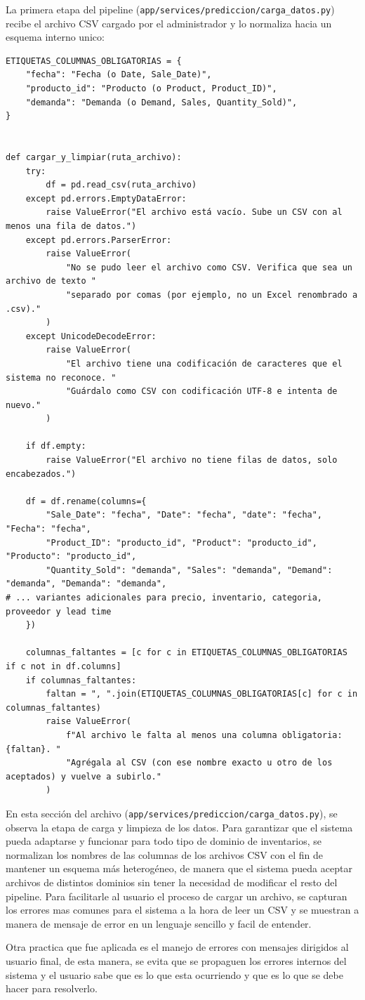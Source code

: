 La primera etapa del pipeline (\texttt{app/services/prediccion/carga\_datos.py}) recibe el archivo CSV cargado por el administrador y lo normaliza hacia un esquema interno unico:


\label{lst:carga_limpieza}
\begin{verbatim}
ETIQUETAS_COLUMNAS_OBLIGATORIAS = {
    "fecha": "Fecha (o Date, Sale_Date)",
    "producto_id": "Producto (o Product, Product_ID)",
    "demanda": "Demanda (o Demand, Sales, Quantity_Sold)",
}


def cargar_y_limpiar(ruta_archivo):
    try:
        df = pd.read_csv(ruta_archivo)
    except pd.errors.EmptyDataError:
        raise ValueError("El archivo está vacío. Sube un CSV con al menos una fila de datos.")
    except pd.errors.ParserError:
        raise ValueError(
            "No se pudo leer el archivo como CSV. Verifica que sea un archivo de texto "
            "separado por comas (por ejemplo, no un Excel renombrado a .csv)."
        )
    except UnicodeDecodeError:
        raise ValueError(
            "El archivo tiene una codificación de caracteres que el sistema no reconoce. "
            "Guárdalo como CSV con codificación UTF-8 e intenta de nuevo."
        )

    if df.empty:
        raise ValueError("El archivo no tiene filas de datos, solo encabezados.")

    df = df.rename(columns={
        "Sale_Date": "fecha", "Date": "fecha", "date": "fecha", "Fecha": "fecha",
        "Product_ID": "producto_id", "Product": "producto_id", "Producto": "producto_id",
        "Quantity_Sold": "demanda", "Sales": "demanda", "Demand": "demanda", "Demanda": "demanda",
# ... variantes adicionales para precio, inventario, categoria, proveedor y lead time
    })

    columnas_faltantes = [c for c in ETIQUETAS_COLUMNAS_OBLIGATORIAS if c not in df.columns]
    if columnas_faltantes:
        faltan = ", ".join(ETIQUETAS_COLUMNAS_OBLIGATORIAS[c] for c in columnas_faltantes)
        raise ValueError(
            f"Al archivo le falta al menos una columna obligatoria: {faltan}. "
            "Agrégala al CSV (con ese nombre exacto u otro de los aceptados) y vuelve a subirlo."
        )
\end{verbatim}

En esta sección del archivo (\texttt{app/services/prediccion/carga\_datos.py}), se observa la etapa de carga y limpieza de los datos. Para garantizar que el sistema pueda adaptarse y funcionar para todo tipo de dominio de inventarios, se normalizan los nombres de las columnas de los archivos CSV con el fin de mantener un esquema más heterogéneo, de manera que el sistema pueda aceptar archivos de distintos dominios sin tener la necesidad de modificar el resto del pipeline. Para facilitarle al usuario el proceso de cargar un archivo, se capturan los errores mas comunes para el sistema a la hora de leer un CSV y se muestran a manera de mensaje de error en un lenguaje sencillo y facil de entender.

Otra practica que fue aplicada es el manejo de errores con mensajes dirigidos al usuario final, de esta manera, se evita que se propaguen los errores internos del sistema y el usuario sabe que es lo que esta ocurriendo y que es lo que se debe hacer para resolverlo.
